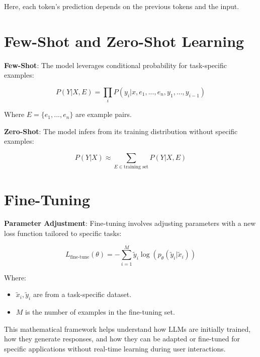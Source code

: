 \documentclass{article}
\begin{document}
Here, each token's prediction depends on the previous tokens and the input.

\section*{Few-Shot and Zero-Shot Learning}

\textbf{Few-Shot}: The model leverages conditional probability for task-specific examples:

\[
P(Y|X, E) = \prod_{i} P(y_i|x, e_1, ..., e_n, y_1, ..., y_{i-1})
\]

Where \( E = \{e_1, ..., e_n\} \) are example pairs.

\textbf{Zero-Shot}: The model infers from its training distribution without specific examples:

\[
P(Y|X) \approx \sum_{E \in \text{training set}} P(Y|X, E)
\]

\section*{Fine-Tuning}

\textbf{Parameter Adjustment}: Fine-tuning involves adjusting parameters with a new loss function tailored to specific tasks:

\[
L_{\text{fine-tune}}(\theta) = - \sum_{i=1}^{M} \tilde{y}_i \log(p_{\theta}(\tilde{y}_i|\tilde{x}_i))
\]

Where:
\begin{itemize}
    \item \( \tilde{x}_i, \tilde{y}_i \) are from a task-specific dataset.
    \item \( M \) is the number of examples in the fine-tuning set.
\end{itemize}

This mathematical framework helps understand how LLMs are initially trained, how they generate responses, and how they can be adapted or fine-tuned for specific applications without real-time learning during user interactions.
\end{document}
